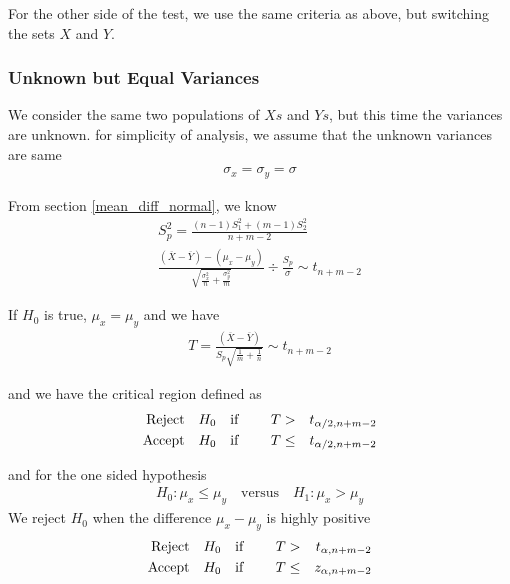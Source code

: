 \documentclass[../probability-notes.tex]{subfiles}
\begin{document}
    For the other side of the test, we use the same criteria as above, but switching the sets $X$ and $Y$.

    
    \subsubsection{Unknown but Equal Variances}
    We consider the same two populations of $Xs$ and $Ys$, but this time the variances are unknown. for simplicity of analysis, we assume that the unknown variances are same
    \begin{align*}
        \sigma_{x} = \sigma_{y} = \sigma
    \end{align*}

    From section \ref{mean_diff_normal}, we know
    \begin{align*}
        S_{p}^{2} = \frac{(n-1)S_{1}^{2} + (m-1)S_{2}^{2}}{n + m - 2}\\
        \frac{(\overline{X} - \overline{Y}) - (\mu_{x} - \mu_{y})}{\sqrt{\frac{\sigma_{x}^{2}}{n} + \frac{\sigma_{y}^{2}}{m}}} \div \frac{S_{p}}{\sigma} \sim t_{n+m-2}
    \end{align*}

    If $H_{0}$ is true, $\mu_{x} = \mu_{y}$ and we have
    \begin{align*}
        T = \frac{(\overline{X} - \overline{Y})}{S_{p}\sqrt{\frac{1}{m} + \frac{1}{n}}} \sim t_{n+m-2}
    \end{align*}

    and we have the critical region defined as
    \begin{alignat*}{4}
        \text{Reject\quad} &H_{0} \text{\quad if \quad} &T &> &t_{\alpha/2, n+m-2}\\
        \text{Accept\quad} &H_{0} \text{\quad if\quad} &T &\leq &t_{\alpha/2, n+m-2}
    \end{alignat*}

    and for the one sided hypothesis
    \begin{align*}
        H_{0}: \mu_{x} \leq \mu_{y} \quad \text{versus} \quad H_{1}: \mu_{x} > \mu_{y}
    \end{align*}
    We reject $H_{0}$ when the difference $\mu_{x} - \mu_{y}$ is highly positive
    \begin{alignat*}{4}
        \text{Reject\quad} &H_{0} \text{\quad if \quad} &T &> &t_{\alpha, n+m-2}\\
        \text{Accept\quad} &H_{0} \text{\quad if\quad} &T &\leq &z_{\alpha, n+m-2}
    \end{alignat*}    
\end{document}
